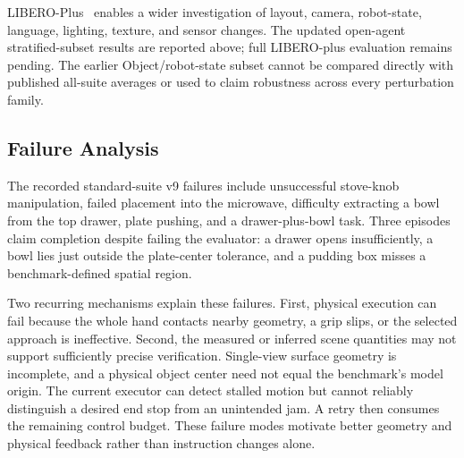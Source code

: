 LIBERO-Plus~\citep{fei2025liberoplus} enables a wider investigation of layout, camera, robot-state, language, lighting, texture, and sensor changes. The updated open-agent stratified-subset results are reported above; full LIBERO-plus evaluation remains pending. The earlier Object/robot-state subset cannot be compared directly with published all-suite averages or used to claim robustness across every perturbation family.

\subsection{Failure Analysis}
The recorded standard-suite v9 failures include unsuccessful stove-knob manipulation, failed placement into the microwave, difficulty extracting a bowl from the top drawer, plate pushing, and a drawer-plus-bowl task. Three episodes claim completion despite failing the evaluator: a drawer opens insufficiently, a bowl lies just outside the plate-center tolerance, and a pudding box misses a benchmark-defined spatial region.

Two recurring mechanisms explain these failures. First, physical execution can fail because the whole hand contacts nearby geometry, a grip slips, or the selected approach is ineffective. Second, the measured or inferred scene quantities may not support sufficiently precise verification. Single-view surface geometry is incomplete, and a physical object center need not equal the benchmark's model origin. The current executor can detect stalled motion but cannot reliably distinguish a desired end stop from an unintended jam. A retry then consumes the remaining control budget. These failure modes motivate better geometry and physical feedback rather than instruction changes alone.
